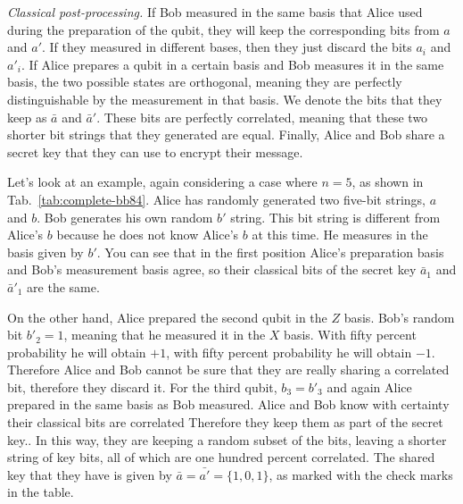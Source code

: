 \emph{Classical post-processing.}
If Bob measured in the same basis that Alice used during the preparation of the qubit, they will keep the corresponding bits from $a$ and $a'$.
If they measured in different bases, then they just discard the bits $a_i$ and $a'_i$.
If Alice prepares a qubit in a certain basis and Bob measures it in the same basis, the two possible states are orthogonal, meaning they are perfectly distinguishable by the measurement in that basis.
We denote the bits that they keep as $\bar{a}$ and $\bar{a}'$.
These bits are perfectly correlated, meaning that these two shorter bit strings that they generated are equal.
Finally, Alice and Bob share a secret key that they can use to encrypt their message.

Let's look at an example, again considering a case where $n=5$, as shown in Tab.~\ref{tab:complete-bb84}.
Alice has randomly generated two five-bit strings, $a$ and $b$.
Bob generates his own random $b'$ string.
This bit string is different from Alice's $b$ because he does not know Alice's $b$ at this time.
He measures in the basis given by $b'$.
You can see that in the first position Alice's preparation basis and Bob's measurement basis agree, so their classical bits of the secret key $\bar{a}_1$ and $\bar{a}'_1$ are the same.

On the other hand, Alice prepared the second qubit in the $Z$ basis.
Bob's random bit $b'_2 = 1$, meaning that he measured it in the $X$ basis.
With fifty percent probability he will obtain $+1$, with fifty percent probability he will obtain $-1$.
Therefore Alice and Bob cannot be sure that they are really sharing a correlated bit, therefore they discard it.
For the third qubit, $b_3 = b'_3$ and again Alice prepared in the same basis as Bob measured.
Alice and Bob know with certainty their classical bits are correlated Therefore they keep them as part of the secret key..
In this way, they are keeping a random subset of the bits, leaving a shorter string of key bits, all of which are one hundred percent correlated.
The shared key that they have is given by $\bar{a} = \bar{a'} = \{1, 0, 1\}$, as marked with the check marks in the table.


